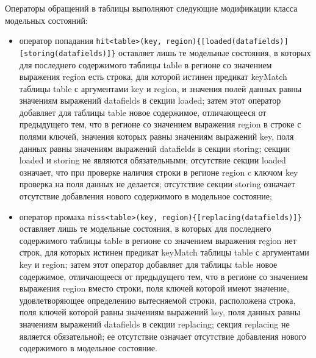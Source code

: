 Операторы обращений в таблицы выполняют следующие модификации класса модельных состояний:
\begin{itemize}
  \item оператор попадания \texttt{hit<table>(key, region)\{[loaded(datafields)]}\\\texttt{[storing(datafields)]\}} оставляет лишь те модельные состояния, в которых для последнего содержимого таблицы table в регионе со значением выражения region есть строка, для которой истинен предикат keyMatch таблицы table с аргументами key и region, и значения полей данных равны значениям выражений datafields в секции loaded; затем этот оператор добавляет для таблицы table новое содержимое, отличающееся от предыдущего тем, что в регионе со значением выражения region в строке с полями ключей, значения которых равны значениям выражений key, поля данных равны значениям выражений datafields в секции storing; секции loaded и storing не являются обязательными; отсутствие секции loaded означает, что при проверке наличия строки в регионе region c ключом key проверка на поля данных не делается; отсутствие секции storing означает отсутствие добавления нового содержимого в модельное состояние;
  \item оператор промаха \texttt{miss<table>(key, region)\{[replacing(datafields)]\}} оставляет лишь те модельные состояния, в которых для последнего содержимого таблицы table в регионе со значением выражения region нет строк, для которых истинен предикат keyMatch таблицы table с аргументами key и region; затем этот оператор добавляет для таблицы table новое содержимое, отличающееся от предыдущего тем, что в регионе со значением выражения region вместо строки, поля ключей которой имеют значение, удовлетворяющее определению вытесняемой строки, расположена строка, поля ключей которой равны значениям выражений key, поля данных равны значениям выражений datafields в секции replacing; секция replacing не является обязательной; ее отсутствие означает отсутствие добавления нового содержимого в модельное состояние.
\end{itemize}

